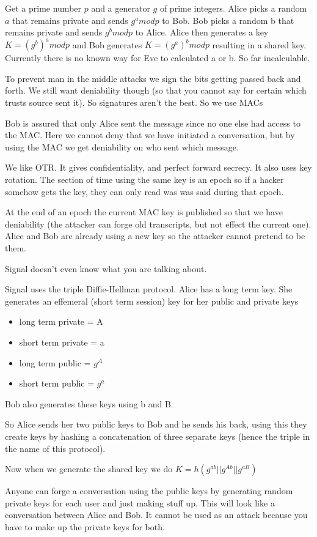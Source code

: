 \documentclass{article}
\begin{document}
Get a prime number $p$ and a generator $g$ of prime integers. Alice picks a random $a$ that remains private and sends $g^a mod p$ to Bob. Bob picks a random b that remains private and sends $g^b mod p$ to Alice. Alice then generates a key $K = (g^b)^a mod p$ and Bob generates $K = (g^a)^b mod p$ resulting in a shared key. Currently there is no known way for Eve to calculated a or b. So far incalculable. 


To prevent man in the middle attacks we sign the bits getting passed back and forth. We still want deniability though (so that you cannot say for certain which trusts source sent it). So signatures aren't the best. So we use MACs


Bob is assured that only Alice sent the message since no one else had access to the MAC. Here we cannot deny that we have initiated a conversation, but by using the MAC we get deniability on who sent which message.



We like OTR. It gives confidentiality, and perfect forward secrecy. It also uses key rotation. The section of time using the same key is an epoch so if a hacker somehow gets the key, they can only read was was said during that epoch.

At the end of an epoch the current MAC key is published so that we have deniability (the attacker can forge old transcripts, but not effect the current one). Alice and Bob are already using a new key so the attacker cannot pretend to be them.


Signal doesn't even know what you are talking about. 


Signal uses the triple Diffie-Hellman protocol. Alice has a long term key. She generates an effemeral (short term session) key for her public and private keys

\begin{itemize}
	\item long term private 	= A
	\item short term private 	= a
	\item long term public 		= $g^A$
	\item short term public 	= $g^a$
\end{itemize}

Bob also generates these keys using b and B. 

So Alice sends her two public keys to Bob and he sends his back, using this they create keys by hashing a concatenation of three separate keys (hence the triple in the name of this protocol).

Now when we generate the shared key we do $K = h(g^{ab} || g^{Ab} || g^{aB})$

Anyone can forge a conversation using the public keys by generating random private keys for each user and just making stuff up. This will look like a conversation between Alice and Bob. It cannot be used as an attack because you have to make up the private keys for both.


\end{document}
